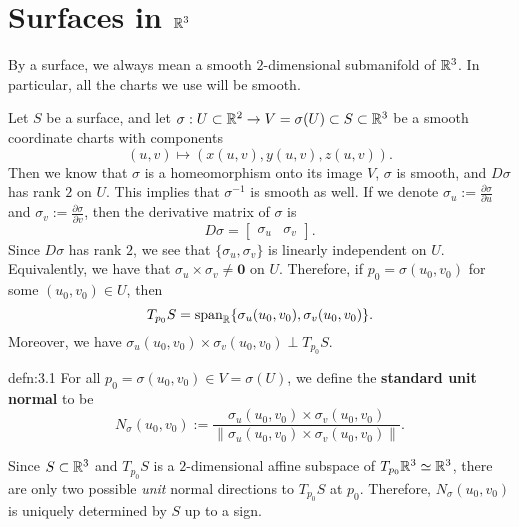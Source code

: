 \section{Surfaces in $\mathbb{R}^3$}\label{sec:3}
By a surface, we always mean a smooth $2$-dimensional submanifold of $\mathbb{R}^3$. 
In particular, all the charts we use will be smooth. 

Let $S$ be a surface, and let $\sigma : U \subset \mathbb{R}^2 \to V = \sigma(U) 
\subset S \subset \mathbb{R}^3$ be a smooth coordinate charts with components 
\[ (u, v) \mapsto (x(u, v), y(u, v), z(u, v)). \] 
Then we know that $\sigma$ is a homeomorphism onto its image $V$, 
$\sigma$ is smooth, and $D\sigma$ has rank $2$ on $U$. This implies that 
$\sigma^{-1}$ is smooth as well. If we denote $\sigma_u 
:= \frac{\partial\sigma}{\partial u}$ and $\sigma_v := 
\frac{\partial\sigma}{\partial v}$, then the derivative matrix of $\sigma$ is 
\[ D\sigma = \left[ \begin{array}{c|c}
    \!\!\!\sigma_u & \sigma_v\!\!\!
\end{array} \right]. \] 
Since $D\sigma$ has rank $2$, we see that $\{\sigma_u, \sigma_v\}$ is 
linearly independent on $U$. Equivalently, we have that $\sigma_u \times 
\sigma_v \neq \mathbf 0$ on $U$. Therefore, if $p_0 = \sigma(u_0, v_0)$ 
for some $(u_0, v_0) \in U$, then 
\[ T_{p_0}S = \operatorname{span}_{\mathbb{R}}\{\sigma_u(u_0, v_0), \sigma_v(u_0, v_0)\}. \] 
Moreover, we have $\sigma_u(u_0, v_0) \times \sigma_v(u_0, v_0) \perp T_{p_0}S$. 

\begin{defn}{defn:3.1}
    For all $p_0 = \sigma(u_0, v_0) \in V = \sigma(U)$, we define 
    the {\bf standard unit normal} to be 
    \[ N_\sigma(u_0, v_0) := \frac{\sigma_u(u_0, v_0) \times \sigma_v(u_0, v_0)}
    {\|\sigma_u(u_0, v_0) \times \sigma_v(u_0, v_0)\|}. \] 
\end{defn}\vspace{-0.25cm}

Since $S \subset \mathbb{R}^3$ and $T_{p_0}S$ is a $2$-dimensional affine subspace of 
$T_{p_0}\mathbb{R}^3 \simeq \mathbb{R}^3$, there are only two possible \emph{unit} normal 
directions to $T_{p_0}S$ at $p_0$. Therefore, $N_\sigma(u_0, v_0)$ is 
uniquely determined by $S$ up to a sign. 

